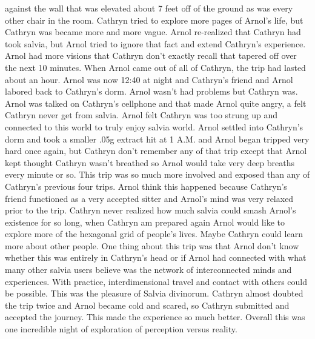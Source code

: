 \documentclass[12pt]{book}
\begin{document}
against the wall that was elevated about 7 feet off of the ground as was every other chair in the room. Cathryn tried to explore more pages of Arnol's life, but Cathryn was became more and more vague. Arnol re-realized that Cathryn had took salvia, but Arnol tried to ignore that fact and extend Cathryn's experience. Arnol had more visions that Cathryn don't exactly recall that tapered off over the next 10 minutes. When Arnol came out of all of Cathryn, the trip had lasted about an hour. Arnol was now 12:40 at night and Cathryn's friend and Arnol labored back to Cathryn's dorm. Arnol wasn't had problems but Cathryn was. Arnol was talked on Cathryn's cellphone and that made Arnol quite angry, a felt Cathryn never get from salvia. Arnol felt Cathryn was too strung up and connected to this world to truly enjoy salvia world. Arnol settled into Cathryn's dorm and took a smaller .05g extract hit at 1 A.M. and Arnol began tripped very hard once again, but Cathryn don't remember any of that trip except that Arnol kept thought Cathryn wasn't breathed so Arnol would take very deep breaths every minute or so. This trip was so much more involved and exposed than any of Cathryn's previous four trips. Arnol think this happened because Cathryn's friend functioned as a very accepted sitter and Arnol's mind was very relaxed prior to the trip. Cathryn never realized how much salvia could smash Arnol's existence for so long, when Cathryn am prepared again Arnol would like to explore more of the hexagonal grid of people's lives. Maybe Cathryn could learn more about other people. One thing about this trip was that Arnol don't know whether this was entirely in Cathryn's head or if Arnol had connected with what many other salvia users believe was the network of interconnected minds and experiences. With practice, interdimensional travel and contact with others could be possible. This was the pleasure of Salvia divinorum. Cathryn almost doubted the trip twice and Arnol became cold and scared, so Cathryn submitted and accepted the journey. This made the experience so much better. Overall this was one incredible night of exploration of perception versus reality.
\end{document}
